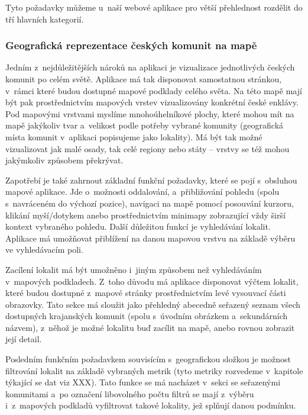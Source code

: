 Tyto požadavky můžeme u~naší webové aplikace pro větší přehlednost rozdělit do tří hlavních kategorií.

\hypertarget{geografickuxe1-reprezentace-ux10deskuxfdch-komunit-na-mapux11b}{%
\subsubsection{Geografická reprezentace českých komunit na mapě}\label{geografickuxe1-reprezentace-ux10deskuxfdch-komunit-na-mapux11b}}

Jedním z~nejdůležitějších nároků na aplikaci je vizualizace jednotlivých českých komunit po celém světě. Aplikace má tak disponovat samostatnou stránkou, v~rámci které budou dostupné mapové podklady celého světa. Na této mapě mají být pak prostřednictvím mapových vrstev vizualizovány konkrétní české enklávy. Pod mapovými vrstvami myslíme mnohoúhelníkové plochy, které mohou mít na mapě jakýkoliv tvar a~velikost podle potřeby vybrané komunity (geografická místa komunit v~aplikaci popisujeme jako lokality). Má být tak možné vizualizovat jak malé osady, tak celé regiony nebo státy -- vrstvy se též mohou jakýmkoliv způsobem překrývat.

Zapotřebí je také zahrnout základní funkční požadavky, které se pojí s~obsluhou mapové aplikace. Jde o~možnosti oddalování, a~přibližování pohledu (spolu s~navráceném do výchozí pozice), navigaci na mapě pomocí posouvání kurzoru, klikání myší/dotykem anebo prostřednictvím minimapy zobrazující vždy širší kontext vybraného pohledu. Další důležitou funkcí je vyhledávání lokalit. Aplikace má umožňovat přiblížení na danou mapovou vrstvu na základě výběru ve vyhledávacím poli.

Zacílení lokalit má být umožněno i~jiným způsobem než vyhledáváním v~mapových podkladech. Z~toho důvodu má aplikace disponovat výčtem lokalit, které budou dostupné z~mapové stránky prostřednictvím levé vysouvací části obrazovky. Tato sekce má sloužit jako přehledný abecedně seřazený seznam všech dostupných krajanských komunit (spolu s~úvodním obrázkem a~sekundárních názvem), z~něhož je možné lokalitu buď zacílit na mapě, anebo rovnou zobrazit její detail.

Posledním funkčním požadavkem souvisícím s~geografickou složkou je možnost filtrování lokalit na základě vybraných metrik (tyto metriky rozvedeme v~kapitole týkající se dat viz XXX). Tato funkce se má nacházet v~sekci se seřazenými komunitami a~po označení libovolného počtu filtrů se mají z~výběru i~z~mapových podkladů vyfiltrovat takové lokality, jež splňují danou podmínku.

